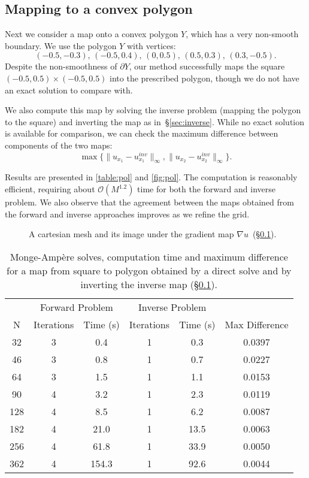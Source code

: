 \documentclass{amsart}
\theoremstyle{lemma}
\theoremstyle{remark}
\begin{document}
\subsection{Mapping to a convex polygon}\label{sec:exPol}
Next we consider a map onto a convex polygon $Y$, which has a very non-smooth boundary.   We use the polygon $Y$ with vertices:
\[ (-0.5,-0.3),\,(-0.5,0.4),\,(0,0.5),\,(0.5,0.3),\,(0.3,-0.5). \]
Despite the non-smoothness of $\partial Y$, our method successfully maps the square $(-0.5,0.5)\times(-0.5,0.5)$ into the prescribed polygon, though we do not have an exact solution to compare with.

We also compute this map by solving the inverse problem (mapping the polygon to the square) and inverting the map as in~\S\ref{sec:inverse}.  While no exact solution is available for comparison, we can check the maximum difference between components of the two maps:
\[ \max\{\|u_{x_1} - u_{x_1}^{inv}\|_\infty, \|u_{x_2}-u_{x_2}^{inv}\|_\infty\}. \]

Results are presented in \autoref{table:pol} and \autoref{fig:pol}.  The computation is reasonably efficient, requiring about ${\mathcal{O}}(M^{1.2})$ time for both the forward and inverse problem.  We also observe that the agreement between the maps obtained from the forward and inverse approaches improves as we refine the grid.

\begin{figure}[htdp]
	\centering
  	\vspace*{-12pt}\caption{ A cartesian mesh and  its image under the gradient map $\nabla u$~(\S\ref{sec:exPol}).}
  	\label{fig:pol}
\end{figure} 

\begin{table}[htdp]\small
\begin{center}
\begin{tabular}{cccccc}
 &  \multicolumn{2}{c}{Forward Problem} & \multicolumn{2}{c}{Inverse Problem} \\
N  &  Iterations & Time (s)  & Iterations & Time (s) & Max Difference\\
\hline
32 & 3 & 0.4 & 1 & 0.3 & 0.0397\\
46 & 3 & 0.8 & 1 & 0.7 & 0.0227\\
64 & 3 & 1.5 & 1 & 1.1 & 0.0153\\
90 &  4 & 3.2 & 1 & 2.3 & 0.0119\\
128 & 4 & 8.5 & 1 & 6.2 & 0.0087\\
182 &  4 & 21.0 & 1 & 13.5 & 0.0063\\
256 & 4& 61.8 & 1 & 33.9 & 0.0050\\
362 & 4 & 154.3 & 1 & 92.6 & 0.0044
\end{tabular}
\end{center}
\caption{{{Monge-Amp\`ere}\xspace} solves, computation time and maximum difference for a map from square to polygon obtained by a direct solve and by inverting the inverse map (\S\ref{sec:exPol}).}
\label{table:pol}
\end{table}
\end{document}
